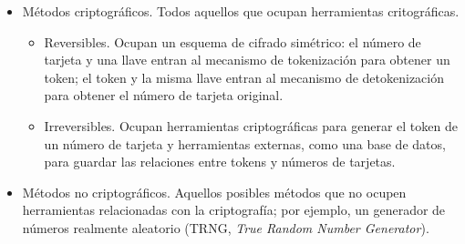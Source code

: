 \begin{itemize}
  \item Métodos criptográficos. Todos aquellos que ocupan herramientas
    critográficas.
    \begin{itemize}
      \item Reversibles. Ocupan un esquema de cifrado simétrico: el número
        de tarjeta y una llave entran al mecanismo de tokenización para obtener
        un token; el token y la misma llave entran al mecanismo de
        detokenización para obtener el número de tarjeta original.
      \item Irreversibles. Ocupan herramientas criptográficas para generar el
        token de un número de tarjeta y herramientas externas, como una
        base de datos, para guardar las relaciones entre tokens y números de
        tarjetas.
    \end{itemize}
  \item Métodos no criptográficos. Aquellos posibles métodos que no ocupen
    herramientas relacionadas con la criptografía; por ejemplo, un generador de
    números realmente aleatorio (TRNG, \textit{True Random Number Generator}).
\end{itemize}
